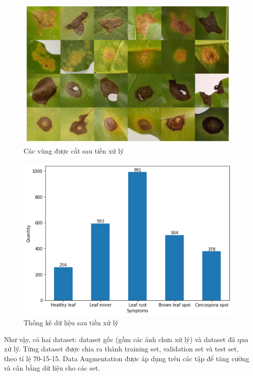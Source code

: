 \documentclass[a4paper,14pt]{extarticle}
\begin{document}
	\begin{figure}[H]
		\centering
		\includegraphics[scale=0.3]{images/image3}
		\caption{Các vùng được cắt sau tiền xử lý}
	\end{figure}
	
	\begin{figure}[H]
		\centering
		\includegraphics[scale=0.6]{images/processed_dataset}
		\caption{Thống kê dữ liệu sau tiền xử lý}
	\end{figure}

	Như vậy, có hai dataset: dataset gốc (gồm các ảnh chưa xử lý) và dataset đã qua xử lý. Từng dataset được chia ra thành training set, validation set và test set, theo tỉ lệ 70-15-15. Data Augmentation được áp dụng trên các tập để tăng cường và cân bằng dữ liệu cho các set.
\end{document}
